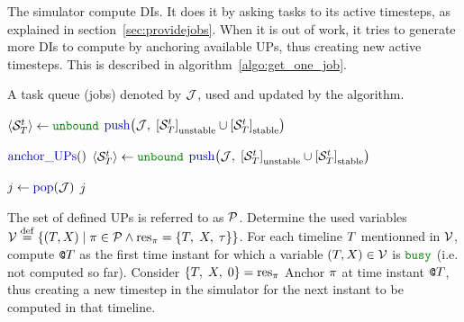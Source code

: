 The simulator compute DIs. It does it by asking tasks to its active timesteps, as explained in section~\ref{sec:providejobs}. When it is out of work, it tries to generate more DIs to compute by anchoring available UPs, thus creating new active timesteps. This is described in algorithm~\ref{algo:get_one_job}.
\begin{algorithm}
  \caption{$\cxSimA$ \label{algo:get_one_job}}
  \begin{algorithmic}[1]
    \REQUIRE A task queue (jobs) denoted by ${\cal J}$, used and updated by the algorithm.
    \IF{$\cxSimB$}
    \STATE {}
    
    \STATE {}
    \IF{$\cxUbdA$}
    \STATE $\cxSetStatusTSUnbound$  
    \ENDIF
    \IF{$\cxSimC$}
    \STATE $\cxSimD$ 
    \ENDIF
    \ENDFOR
    
    \IF{$\cxSimB$}
    \STATE {}
    \STATE {}
    \STATE $\cxSimE$ 
    \STATE {}
    \STATE {}
    \IF{$\cxUbdA$}
    \STATE $\cxSetStatusTSUnbound$  
    \ENDIF
    \IF{$\cxSimC$}
    \STATE $\cxSimD$ 
    \ENDIF
    \ENDFOR
    \ENDIF

    
    \ENDIF
    \IF{$\cxSimB$}
    \RETURN {}
    \ELSE
    \STATE $\cxSimF$
    \RETURN $j$ 
    \ENDIF
  \end{algorithmic}
\end{algorithm}


\begin{algorithm}
  \caption{$\cxAnchorA$ \label{algo:anchor}}
  \begin{algorithmic}[1]
    \REQUIRE The set of defined UPs is referred to as ${\cal P}$.
    \STATE Determine the used variables ${{\cal V}}\;{\stackrel{\mathrm{def}}{=}}\;{\left\{\left(T,X\right)\; \middle| \; {{\pi}\in{{\cal P}}} \wedge {{{\mathrm{res}}_{\pi}}={\left\{ T,\;X,\;\tau \right\}}}\right\}}$.
    \STATE For each timeline $T$ mentionned in ${\cal V}$, compute ${\mbox{\tt @}}{T}$ as the first time instant for which a variable ${\left(T,X\right)}\in{{\cal V}}$ is $\cxBusy$ (i.e. not computed so far).
    \FORALL{$\cxAnchorD$}
    \STATE Consider ${\left\{ T,\;X,\;0 \right\}}={{\mathrm{res}}_{\pi}}$
    \IF{$\cxAnchorF$}
    \STATE Anchor $\pi$ at time instant ${\mbox{\tt @}}{T}$, thus creating a new timestep in the simulator for the next instant to be computed in that timeline.
    \ELSE
    \STATE {}
    \ENDIF
    \ENDFOR
  \end{algorithmic}
\end{algorithm}

